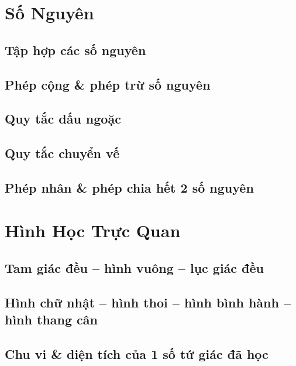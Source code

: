 \documentclass{article}
\numberwithin{equation}{section}
\begin{document}
\section{Số Nguyên}

\subsection{Tập hợp các số nguyên}

\subsection{Phép cộng \& phép trừ số nguyên}

\subsection{Quy tắc dấu ngoặc}

\subsection{Quy tắc chuyển vế}

\subsection{Phép nhân \& phép chia hết 2 số nguyên}


\section{Hình Học Trực Quan}

\subsection{Tam giác đều -- hình vuông -- lục giác đều}

\subsection{Hình chữ nhật -- hình thoi -- hình bình hành -- hình thang cân}

\subsection{Chu vi \& diện tích của 1 số tứ giác đã học}

\end{document}
